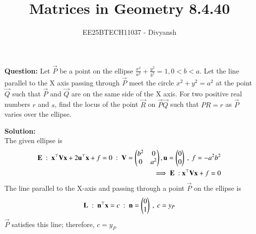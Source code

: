 \documentclass[journal,12pt,onecolumn]{IEEEtran}
\title{Matrices in Geometry 8.4.40}
\author{EE25BTECH11037 - Divyansh}
\theoremstyle{remark}
\begin{document}
\vspace{3cm}
\maketitle
{\let\newpage\relax\maketitle}
\textbf{Question: }
Let $\vec{P}$ be a point on the ellipse $\frac{x^2}{a^2} + \frac{y^2}{b^2}=1 , 0<b<a$. Let the line parallel to the X axis passing through $\vec{P}$ meet the circle $x^2 + y^2= a^2$ at the point $\vec{Q}$ such that $\vec{P}$ and $\vec{Q}$ are on the same side of the X axis. For two positive real numbers $r$ and $s$, find the locus of the point $\vec{R}$ on $\vec{P}\vec{Q}$ such that $PR = r$ as $\vec{P}$ varies over the ellipse.
\vspace{2mm}


\textbf{Solution:}
\\
The given ellipse is 
\begin{align}
    \mathbf{E} \ : \ \mathbf{x}^{\top}\mathbf{V}\mathbf{x} + 2 \mathbf{u}^{\top}\mathbf{x} + f=0 \ : \ \mathbf{V}=\begin{pmatrix}b^2 & 0 \\ 0 & a^2\end{pmatrix}, \mathbf{u}=\begin{pmatrix}0\\0\end{pmatrix}\ , \ f=-a^2b^2 \\
    \implies \mathbf{E} \ : \mathbf{x}^{\top}\mathbf{V}\mathbf{x} + f=0
\end{align}
The line parallel to the X-axis and passing through a point $\vec{P}$ on the ellipse is 
\begin{align}
    \mathbf{L}\ :\ \mathbf{n}^{\top} \mathbf{x} =c \ : \ \mathbf{n}=\begin{pmatrix}0\\1\end{pmatrix} \ , \ c=y_P
\end{align}
$\vec{P}$ satisfies this line; therefore, $c=y_P$
\end{document}
